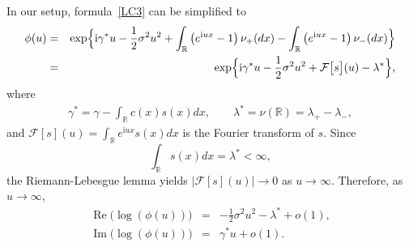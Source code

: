\documentclass[a4paper,11pt]{article}
\theoremstyle{definition}
\newtheorem{remark}{Remark}
\newcommand{\R}{{\mathbb{R}}}
\newcommand{\1}{\mathbb{I}}
\renewcommand{\i}{\mathrm{i}}
\def\R{\mathbb{R}}
\renewcommand{\Re}{\operatorname{Re}}
\renewcommand{\Im}{\operatorname{Im}}
\newcommand{\F}{\mathcal{F}}
\theoremstyle{remark}
\begin{document}
In our setup, formula~\eqref{LC3} can be simplified to 
\begin{eqnarray}\nonumber     \phi(u)
    &=&
    \exp\Bigl\{
      \i \gamma^* u-\frac{1}{2}\sigma^2 u^2
			    +
		    \int_{\mathbb{R}}
		    \left( 
		    		e^{\i u x}-1	\right)			\nu_+(dx) -%
	    \int_{\mathbb{R}}
		    \left( 
		    		e^{\i u x}-1 	\right)			\nu_-(dx)				\Bigr\}\\		\label{phiexp}
&=&  \exp\Bigl\{
      \i \gamma^* u-\frac{1}{2}\sigma^2 u^2
			    +
\F\bigl[s \bigr](u) -  \lambda^*\Bigr\},
\end{eqnarray}
where 
\begin{eqnarray*}
    \gamma^* = \gamma - \int_{\R} c(x)s(x) dx, \qquad 
    \lambda^* = \nu(\R) = \lambda_{+} - \lambda_{-},
\end{eqnarray*}
and
$\F[s](u) = \int_\R e^{\i u x} s(x) dx$ is the Fourier transform of \(s.\) Since \[\int_\R s(x) dx = \lambda^* <\infty,\]  the  Riemann-Lebesgue lemma yields
\(
  \bigl| \F[s](u) \bigr| \rightarrow 0\) as \(u \to \infty\).
Therefore, as \(u \to \infty\), 
\begin{eqnarray}\label{e1}
        \Re \bigl( \log(\phi(u)) \bigr) &=&  -\frac{1}{2} \sigma^2 u^2 - \lambda^{*} +o(1), \\
        \label{e2}
        \Im \bigl( \log(\phi(u)) \bigr) &=&\gamma^{*}u + o(1).
\end{eqnarray}
\end{document}
